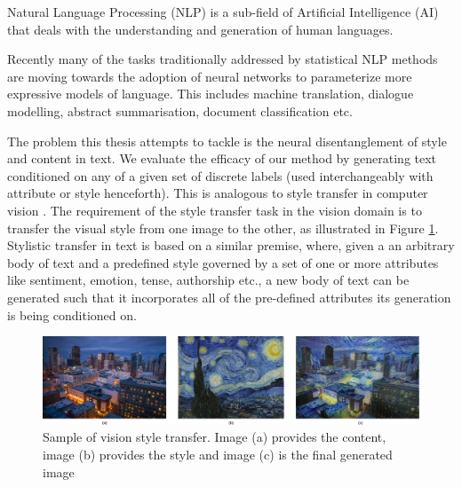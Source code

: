 Natural Language Processing (NLP) is a sub-field of Artificial Intelligence (AI) that deals with the understanding and generation of human languages.

Recently many of the tasks traditionally addressed by statistical NLP methods are moving towards the adoption of neural networks to parameterize more expressive models of language. This includes machine translation, dialogue modelling, abstract summarisation, document classification etc.

The problem this thesis attempts to tackle is the neural disentanglement of style and content in text. We evaluate the efficacy of our method by generating text conditioned on any of a given set of discrete labels (used interchangeably with attribute or style henceforth). This is analogous to style transfer in computer vision \citep{gatys2016image}. The requirement of the style transfer task in the vision domain is to transfer the visual style from one image to the other, as illustrated in Figure \ref{fig:style-transfer-vision}. Stylistic transfer in text is based on a similar premise, where, given a an arbitrary body of text and a predefined style governed by a set of one or more attributes like sentiment, emotion, tense, authorship etc., a new body of text can be generated such that it incorporates all of the pre-defined attributes its generation is being conditioned on.

\begin{figure}[ht]
	\centering
	\includegraphics[width=\textwidth]{images/style-transfer-vision.png}
	\caption{\label{fig:style-transfer-vision}Sample of vision style transfer. Image (a) provides the content, image (b) provides the style and image (c) is the final generated image}
\end{figure}


